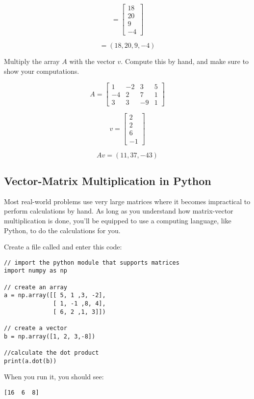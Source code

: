 $$= \begin{bmatrix}
18 \\
20\\
9\\
-4 
\end{bmatrix}$$

$$= (18,20,9,-4)$$

\begin{Exercise}[title={Vector Matrix Multiplication}, label=vector-matrix-multiply01]

Multiply the array $A$ with the vector $v$. Compute this by hand, and make sure to show your computations. 

$$A = \begin{bmatrix}
 1 &-2  &3 &5  \\
 -4  &2  &7 &1 \\
 3  &3  &-9 &1
\end{bmatrix}$$

$$v = \begin{bmatrix}
 2 \\
 2  \\
 6 \\
 -1
\end{bmatrix}$$
\end{Exercise}

\begin{Answer}[ref=vector-matrix-multiply01]
$$Av = (11, 37, -43)$$
\end{Answer}


\subsection{Vector-Matrix Multiplication in Python}

Most real-world problems use very large matrices where it becomes impractical to perform calculations by hand. As long as you understand how matrix-vector multiplication is done, you'll be equipped to use a computing language, like Python, to do the calculations for you. 

Create a file called  and enter this code:

\begin{Verbatim}
// import the python module that supports matrices
import numpy as np

// create an array
a = np.array([[ 5, 1 ,3, -2], 
              [ 1, -1 ,8, 4], 
              [ 6, 2 ,1, 3]])

// create a vector 
b = np.array([1, 2, 3,-8])

//calculate the dot product
print(a.dot(b))
\end{Verbatim}

When you run it, you should see:

\begin{Verbatim}
[16  6  8]
\end{Verbatim}



